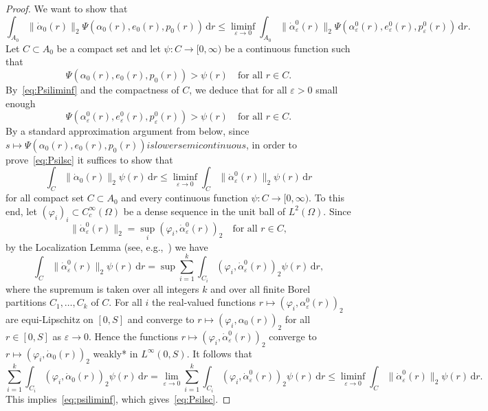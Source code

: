 \documentclass[reqno]{amsart}
\theoremstyle{definition}
\numberwithin{equation}{section}
\def\de {\mathrm{d}}
\begin{document}
\begin{proof}
We want to show that
\begin{equation}\label{eq:Psilsc}
\int_{A_0}\|\dot\alpha_0(r)\|_2\Psi(\alpha_0(r),e_0(r),p_0(r))\,\de r\le\liminf_{\varepsilon\to 0}\int_{A_0}\|\dot\alpha_\varepsilon^0(r)\|_2\Psi(\alpha_\varepsilon^0(r),e_\varepsilon^0(r),p_\varepsilon^0(r))\,\de r.   
\end{equation}
Let $C\subset A_0$ be a compact set and let $\psi\colon C\to [0,\infty)$ be a continuous function such that
$$\Psi(\alpha_0(r),e_0(r),p_0(r))>\psi(r)\quad\text{for all $r\in C$}.$$
By~\eqref{eq:Psiliminf} and the compactness of $C$, we deduce that for all $\varepsilon>0$ small enough
$$\Psi(\alpha_\varepsilon^0(r),e_\varepsilon^0(r),p_\varepsilon^0(r))>\psi(r)\quad\text{for all $r\in C$}.$$
By a standard approximation argument from below, since $s\mapsto \Psi(\alpha_0(r),e_0(r),p_0(r)) is lower semicontinuous$, in order to prove~\eqref{eq:Psilsc} it suffices to show that
\begin{equation}\label{eq:psiliminf}
\int_C\|\dot\alpha_0(r)\|_2\psi(r)\,\de r\le\liminf_{\varepsilon\to 0}\int_C\|\dot\alpha_\varepsilon^0(r)\|_2\psi(r)\,\de r
\end{equation}
for all compact set $C\subset A_0$ and every  continuous function $\psi\colon C\to [0,\infty)$. To this end, let
$(\varphi_i)_i\subset C_c^\infty(\Omega)$ be a dense sequence in the unit ball of $L^2(\Omega)$. Since
$$\|\dot\alpha_\varepsilon^0(r)\|_2=\sup_i(\varphi_i,\dot\alpha_\varepsilon^0(r))_2\quad\text{for all $r\in C$},$$
by the Localization Lemma (see, e.g.,~\cite[Lemma 2.3.2]{Bu}) we have
$$\int_C\|\dot\alpha_\varepsilon^0(r)\|_2\psi(r)\,\de r=\sup\sum_{i=1}^k\int_{C_i}(\varphi_i,\dot\alpha_\varepsilon^0(r))_2\psi(r)\,\de r,$$
where the supremum is taken over all integers $k$ and over all finite Borel partitions $C_1,\dots,C_k$ of $C$. For all $i$ the real-valued functions $r\mapsto (\varphi_i,\alpha_\varepsilon^0(r))_2$ are equi-Lipschitz on $[0,S]$ and converge to $r\mapsto (\varphi_i,\alpha_0(r))_2$ for all $r\in[0,S]$ as $\varepsilon\to 0$. Hence the functions $r\mapsto (\varphi_i,\dot\alpha_\varepsilon^0(r))_2$ converge to $r\mapsto (\varphi_i,\dot\alpha_0(r))_2$ weakly* in $L^\infty(0,S)$. It follows that
$$\sum_{i=1}^k\int_{C_i}(\varphi_i,\dot\alpha_0(r))_2\psi(r)\,\de r=\lim_{\varepsilon\to 0}\sum_{i=1}^k\int_{C_i}(\varphi_i,\dot\alpha_\varepsilon^0(r))_2\psi(r)\,\de r\le\liminf_{\varepsilon\to 0}\int_C\|\dot\alpha_\varepsilon^0(r)\|_2\psi(r)\,\de r.$$
This implies~\eqref{eq:psiliminf}, which gives~\eqref{eq:Psilsc}. 


\end{proof}
\end{document}
